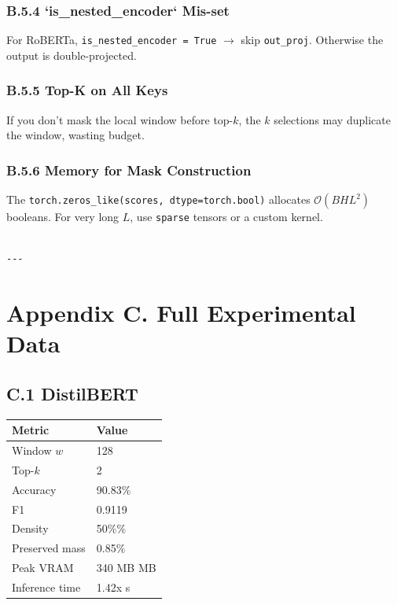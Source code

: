 \subsubsection{B.5.4 `is\_nested\_encoder` Mis-set}

For RoBERTa, \texttt{is\_nested\_encoder = True} $\to$ skip \texttt{out\_proj}. Otherwise the 
output is double-projected.

\subsubsection{B.5.5 Top-K on All Keys}

If you don't mask the local window before top-$k$, the $k$ selections may 
duplicate the window, wasting budget.

\subsubsection{B.5.6 Memory for Mask Construction}

The \texttt{torch.zeros\_like(scores, dtype=torch.bool)} allocates 
$\mathcal{O}(B H L^2)$ booleans. For very long $L$, use \texttt{sparse} tensors 
or a custom kernel.
\begin{lstlisting}

---
\end{lstlisting}


\section{Appendix C. Full Experimental Data}

\subsection{C.1 DistilBERT}

\begin{table}[H]
\centering
\small
\begin{tabular}{ll}
\toprule
\textbf{Metric} & \textbf{Value} \\
\midrule
Window $w$ & 128 \\
Top-$k$ & 2 \\
Accuracy & 90.83\% \\
F1 & 0.9119 \\
Density & 50\%\% \\
Preserved mass & 0.85\% \\
Peak VRAM & 340 MB MB \\
Inference time & 1.42x s \\
\bottomrule
\end{tabular}
\end{table}

